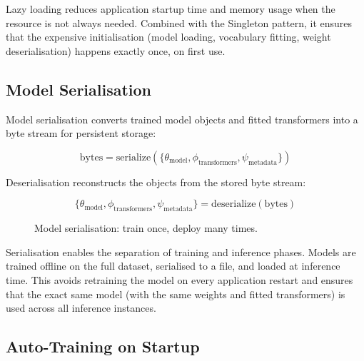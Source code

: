 \documentclass[10pt,a4paper]{article}
\begin{document}
Lazy loading reduces application startup time and memory usage when the resource is not always needed. Combined with the Singleton pattern, it ensures that the expensive initialisation (model loading, vocabulary fitting, weight deserialisation) happens exactly once, on first use.

\subsection{Model Serialisation}
\label{sec:model-serialization}

Model serialisation converts trained model objects and fitted transformers into a byte stream for persistent storage:

\begin{equation}
\text{bytes} = \text{serialize}(\{\theta_{\text{model}}, \phi_{\text{transformers}}, \psi_{\text{metadata}}\})
\label{eq:serialization}
\end{equation}

Deserialisation reconstructs the objects from the stored byte stream:

\begin{equation}
\{\theta_{\text{model}}, \phi_{\text{transformers}}, \psi_{\text{metadata}}\} = \text{deserialize}(\text{bytes})
\label{eq:deserialization}
\end{equation}

\begin{figure}[H]
    \centering
    \caption{Model serialisation: train once, deploy many times.}
    \label{fig:model-serialization}
\end{figure}

Serialisation enables the separation of training and inference phases. Models are trained offline on the full dataset, serialised to a file, and loaded at inference time. This avoids retraining the model on every application restart and ensures that the exact same model (with the same weights and fitted transformers) is used across all inference instances.

\subsection{Auto-Training on Startup}
\label{sec:auto-training}
\end{document}
